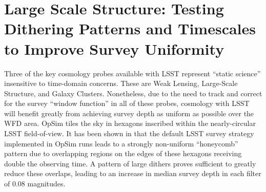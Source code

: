 %
%
%
%
%
%
%
\clearpage
\section{Large Scale Structure:  Testing Dithering Patterns and Timescales to Improve Survey Uniformity}
\def\secname{lss}\label{sec:\secname}




Three of the key cosmology probes available with LSST represent ``static science'' insensitive to time-domain concerns.  These are Weak Lensing, Large-Scale Structure, and Galaxy Clusters.  Nonetheless, due to the need to track and correct for the survey ``window function'' in all of these probes, cosmology with LSST will benefit greatly from achieving survey depth as uniform as possible over the WFD area.  OpSim tiles the sky in hexagons inscribed within the nearly-circular LSST field-of-view.  It has been shown in \citet{CarrollEtal2014} that the default LSST survey strategy implemented in OpSim runs leads to a strongly non-uniform ``honeycomb'' pattern due to overlapping regions on the edges of these hexagons receiving double the observing time.  A pattern of large dithers proves sufficient to greatly reduce these overlaps, leading to an increase in median survey depth in each filter of 0.08 magnitudes.  

